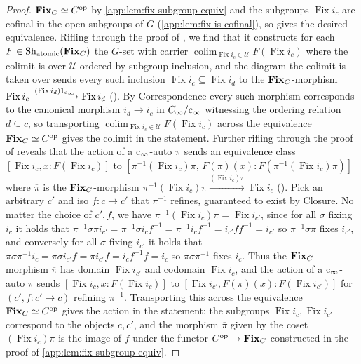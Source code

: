 \documentclass[
  sigconf,
  screen, ]{acmart}
\theoremstyle{definition}
\newcommand\colim{\operatorname{colim}}
\newcommand\calU{\mathcal U}
\newcommand\Shjat{\operatorname{Sh}_{{\rm atomic}}}
\newcommand\op{^{\rm op}}
\newcommand\Fix{\operatorname{Fix}}
\newcommand\cinfty{{{\rm c}_\infty}}
\newcommand\subgrpcat{{\bf Fix}}
\begin{document}
\begin{proof}
  $\subgrpcat_C \simeq C^{\rm op}$ by \cref{app:lem:fix-subgroup-equiv}
  and the subgroups $\Fix i_c$ are cofinal in the open subgroups of $G$ (\cref{app:lem:fix-is-cofinal}),
  so \citet[Theorem III.9.2]{maclane2012sheaves} gives
  the desired equivalence.
  Rifling through the proof of \citet[Theorem III.9.2]{maclane2012sheaves}, we find that 
  it constructs for each $F\in\Shjat(\subgrpcat_C)$
  the $G$-set
  with carrier $\colim_{\Fix i_c\in\calU} F(\Fix i_c)$
  where the colimit is over $\calU$
  ordered by subgroup inclusion,
  and the diagram the colimit is taken over sends every such
  inclusion $\Fix i_c\subseteq \Fix i_d$
  to the $\subgrpcat_C$-morphism
  $\Fix{i_c}\xrightarrow{(\Fix{i_d})1_{\cinfty}}\Fix{i_d}$ (\citet[p. 153]{maclane2012sheaves}).
  By Correspondence every such morphism corresponds to
  the canonical morphism $i_d\to i_c$
  in $C_\infty/\cinfty$ witnessing
  the ordering relation $d\subseteq c$,
  so transporting
  $\colim_{\Fix i_c\in\calU} F(\Fix i_c)$
  across the equivalence $\subgrpcat_C\simeq C\op$  gives the colimit
  in the statement.
  Further rifling through the proof of \citet[Theorem III.9.2]{maclane2012sheaves}
  reveals that the action of a $\cinfty$-auto $\pi$ 
  sends an equivalence class $[\Fix{i_c},x : F(\Fix{i_c})]$
  to $[\pi^{-1}(\Fix{i_c})\pi,\, F(\overline\pi)(x):F(\pi^{-1}(\Fix{i_c})\pi)]$
  where $\overline\pi$ is the $\subgrpcat_C$-morphism
  $\pi^{-1}(\Fix{i_c})\pi \xrightarrow{(\Fix{i_c})\pi} \Fix{i_c}$ (\citet[p. 153]{maclane2012sheaves}).
  Pick an arbitrary $c'$ and iso $f : c\to c'$ that $\pi^{-1}$ refines, guaranteed to exist by Closure.
  No matter the choice of $c',f$, we have 
  $\pi^{-1}(\Fix{i_c})\pi = \Fix{i_{c'}}$,
  since for all $\sigma$ fixing $i_c$ it holds that
  $\pi^{-1}\sigma\pi i_{c'} 
  = \pi^{-1}\sigma i_c f^{-1} = \pi^{-1} i_c f^{-1} 
  = i_{c'} ff^{-1} = i_{c'}$
  so $\pi^{-1}\sigma \pi$ fixes $i_{c'}$,
  and conversely for all $\sigma$ fixing $i_{c'}$ it holds that
  $\pi\sigma\pi^{-1}i_c 
  = \pi\sigma i_{c'}f
  = \pi i_{c'}f = i_c f^{-1} f = i_c$
  so $\pi\sigma\pi^{-1}$ fixes $i_c$.
  Thus the $\subgrpcat_C$-morphism $\overline\pi$
  has domain $\Fix{i_{c'}}$ and codomain $\Fix{i_c}$,
  and the action of a $\cinfty$-auto $\pi$
  sends $[\Fix i_c, x:F(\Fix i_c)]$
  to $[\Fix i_{c'}, F(\overline\pi)(x) : F(\Fix i_{c'})]$
  for $(c', f : c'\to c)$ refining $\pi^{-1}$.
  Transporting this across
  the equivalence $\subgrpcat_C\simeq C\op$
  gives the action in the statement:
  the subgroups $\Fix i_c,\Fix i_{c'}$
  correspond to the objects $c,c'$, and
  the morphism $\overline\pi$
  given by the coset 
  $(\Fix i_c)\pi$
  is the image of $f$ under the functor 
  $C\op\to\subgrpcat_C$ constructed in the proof of 
  \cref{app:lem:fix-subgroup-equiv}.
\end{proof}
\end{document}
